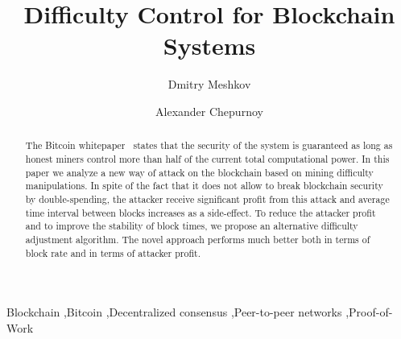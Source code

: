 \documentclass[number,preprint,review]{elsarticle}
\begin{document}
\begin{frontmatter}



\title{Difficulty Control for Blockchain Systems}



\author[iohk]{Dmitry Meshkov}

\author[iohk]{Alexander Chepurnoy}
\address[iohk]{IOHK Research}

\begin{abstract}

The Bitcoin whitepaper~\cite{Nakamoto2008} states that the security of the system is guaranteed as long as honest miners control more than half of the current total computational power. In this paper we analyze a new way of attack on the blockchain based on mining difficulty manipulations. In spite of the fact that it does not allow to break blockchain security by double-spending, the attacker receive significant profit from this attack and average time interval between blocks increases as a side-effect. To reduce the attacker profit and to improve the stability of block times, we propose an alternative difficulty adjustment algorithm. The novel approach performs much better both in terms of block rate and in terms of attacker profit.

\end{abstract}

\begin{keyword}
Blockchain \sep Bitcoin \sep Decentralized consensus \sep Peer-to-peer networks \sep Proof-of-Work
\end{keyword}

\end{frontmatter}
\end{document}
